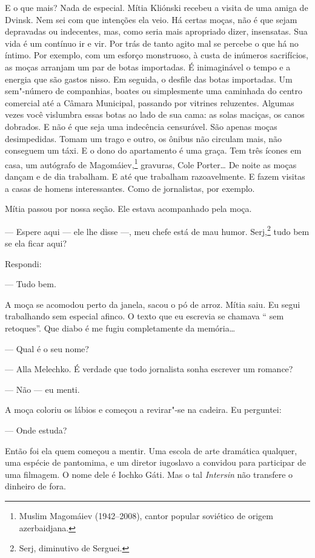 E o que mais? Nada de especial. Mítia Kliónski recebeu a visita de uma
amiga de Dvinsk. Nem sei com que intenções ela veio. Há certas moças,
não é que sejam depravadas ou indecentes, mas, como seria mais
apropriado dizer, insensatas. Sua vida é um contínuo ir e vir. Por trás
de tanto agito mal se percebe o que há no íntimo. Por exemplo, com um
esforço monstruoso, à custa de inúmeros sacrifícios, as moças arranjam
um par de botas importadas. É inimaginável o tempo e a energia que são
gastos nisso. Em seguida, o desfile das botas importadas. Um sem"-número
de companhias, boates ou simplesmente uma caminhada do centro comercial
até a Câmara Municipal, passando por vitrines reluzentes. Algumas vezes
você vislumbra essas botas ao lado de sua cama: as solas maciças, os
canos dobrados. E não é que seja uma indecência censurável. São apenas
moças desimpedidas. Tomam um trago e outro, os ônibus não circulam mais,
não conseguem um táxi. E o dono do apartamento é uma graça. Tem três
ícones em casa, um autógrafo de Magomáiev,\footnote{Muslim Magomáiev
  (1942--2008), cantor popular soviético de origem azerbaidjana.}
gravuras, Cole Porter\ldots{} De noite as moças dançam e de dia trabalham. E
até que trabalham razoavelmente. E fazem visitas a casas de homens
interessantes. Como de jornalistas, por exemplo.

Mítia passou por nossa seção. Ele estava acompanhado pela moça.

--- Espere aqui --- ele lhe disse ---, meu chefe está de mau humor.
Serj,\footnote{Serj, diminutivo de Serguei.} tudo bem se ela ficar aqui?

Respondi:

--- Tudo bem.

A moça se acomodou perto da janela, sacou o pó de arroz. Mítia saiu. Eu
segui trabalhando sem especial afinco. O texto que eu escrevia se
chamava `` sem retoques''. Que diabo é  me fugiu completamente da
memória\ldots{}

--- Qual é o seu nome?

--- Alla Melechko. É verdade que todo jornalista sonha escrever um
romance?

--- Não --- eu menti.

A moça coloriu os lábios e começou a revirar"-se na cadeira. Eu perguntei:

--- Onde estuda?

Então foi ela quem começou a mentir. Uma escola de arte dramática
qualquer, uma espécie de pantomima, e um diretor iugoslavo a convidou
para participar de uma filmagem. O nome dele é Iochko Gáti. Mas o tal
\emph{Intersin} não transfere o dinheiro de fora.

